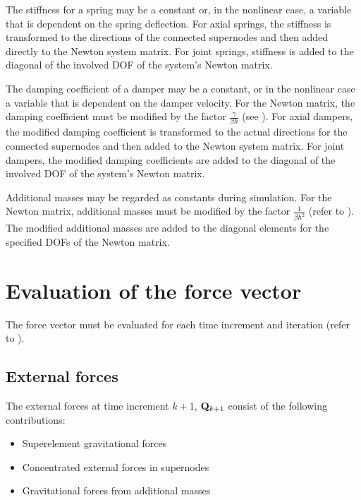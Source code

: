 The stiffness for a spring may be a constant or, in the nonlinear case,
a variable that is dependent on the spring deflection.
For axial springs, the stiffness is transformed to the directions of the
connected supernodes and then added directly to the Newton system matrix.
For joint springs, stiffness is added to the diagonal of the involved DOF
of the system's Newton matrix.

The damping coefficient of a damper may be a constant, or in the nonlinear case
a variable that is dependent on the damper velocity.
For the Newton matrix, the damping coefficient must be modified by the factor
$\frac{\gamma}{\beta h}$ (see ).
For axial dampers, the modified damping coefficient is transformed to the
actual directions for the connected supernodes and then added to the Newton
system matrix.
For joint dampers, the modified damping coefficients are added to the diagonal
of the involved DOF of the system's Newton matrix.

Additional masses may be regarded as constants during simulation.
For the Newton matrix, additional masses must be modified by the factor
$\frac{1}{\beta h^2}$ (refer to ).
The modified additional masses are added to the diagonal elements for the
specified DOFs of the Newton matrix.

\section{Evaluation of the force vector}
\label{s:Evaluation of the force vector}

The force vector must be evaluated for each time increment and iteration (refer
to ).
\iftoggle{publicedition}{}{%
In addition to the contributions described in the sub-sections below,
the force vector may also contain buoyancy and hydrodynamic forces for beam
structures immersed in water.
These forces, and the associated tangent matrix contributions, are described in
Appendix~\ref{chap:Hydrodynamics}.
} %

\subsection{External forces}
\label{subs:External forces}

The external forces at time increment $k+1$, $\Q_\kp1$
consist of the following contributions:
%
\begin{itemize}
\item Superelement gravitational forces
\item Concentrated external forces in supernodes
\item Gravitational forces from additional masses
\end{itemize}

